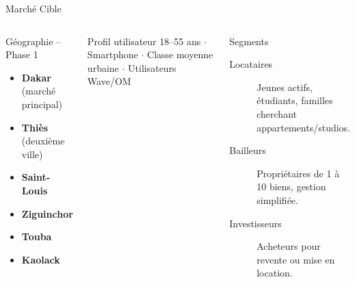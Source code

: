 ﻿\documentclass[aspectratio=169,10pt]{beamer}
\newcommand{\kcbold}[1]{\textcolor{kcCoral}{\textbf{#1}}}
\begin{document}
\begin{frame}{March\'{e} Cible}
\begin{columns}[T]
\begin{block}{G\'{e}ographie -- Phase 1}
\begin{itemize}
\item \kcbold{Dakar} (march\'{e} principal)
\item \kcbold{Thi\`{e}s} (deuxi\`{e}me ville)
\item \kcbold{Saint-Louis}
\item \kcbold{Ziguinchor}
\item \kcbold{Touba}
\item \kcbold{Kaolack}
\end{itemize}
\end{block}
\vspace{0.2cm}
\begin{block}{Profil utilisateur}
18--55 ans $\cdot$ Smartphone $\cdot$ Classe moyenne urbaine $\cdot$ Utilisateurs Wave/OM
\end{block}
\begin{alertblock}{Segments}
\begin{description}
\item[Locataires] Jeunes actifs, \'{e}tudiants, familles cherchant appartements/studios.
\item[Bailleurs] Propri\'{e}taires de 1 \`{a} 10 biens, gestion simplifi\'{e}e.
\item[Investisseurs] Acheteurs pour revente ou mise en location.
\end{description}
\end{alertblock}
\end{columns}
\end{frame}
\end{document}
